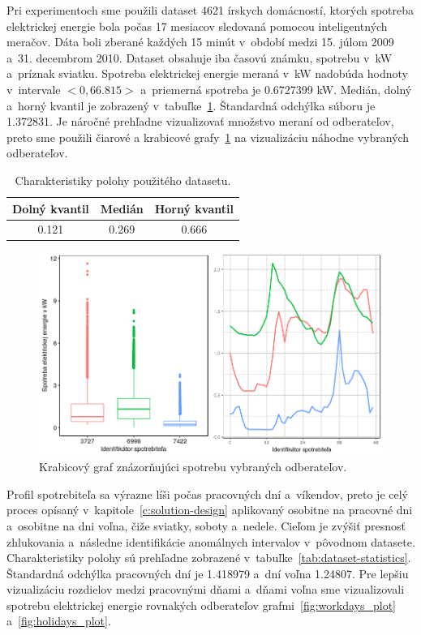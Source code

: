 \documentclass[a4paper,twoside,slovak,12pt,appendix]{article}
\begin{document}
Pri experimentoch sme použili dataset 4621 írskych domácností, ktorých spotreba
elektrickej energie bola počas 17 mesiacov sledovaná pomocou inteligentných
meračov. Dáta boli zberané každých 15 minút v~období medzi 15. júlom 2009 a~31.
decembrom 2010. Dataset obsahuje iba časovú známku, spotrebu v~kW a~príznak
sviatku. Spotreba elektrickej energie meraná v~kW nadobúda hodnoty v~intervale
$<0, 66.815>$ a~priemerná spotreba je 0.6727399 kW. Medián, dolný a~horný
kvantil je zobrazený v~tabuľke~\ref{tab:quantile}. Štandardná odchýlka súboru
je 1.372831. Je náročné prehľadne vizualizovať množstvo meraní od odberateľov,
preto sme použili čiarové a krabicové grafy~\ref{fig:whole_plot} na vizualizáciu
náhodne vybraných odberateľov.

\begin{table}[ht]
  \centering
  \caption{Charakteristiky polohy použitého datasetu.}
  \label{tab:quantile}
  \begin{tabular}{|c|c|c|}
    \hline
    \textbf{Dolný kvantil}  &   \textbf{Medián}		&		\textbf{Horný kvantil} \\ \hline
    0.121								    &   0.269							&		0.666					         \\ \hline
  \end{tabular}
\end{table}

\begin{figure}[htbp]
  \centering
  \includegraphics[width=\textwidth]{sample_plot.png}
  \caption{Krabicový graf znázorňujúci spotrebu vybraných odberateľov.}
  \label{fig:whole_plot}
\end{figure}

Profil spotrebiteľa sa výrazne líši počas pracovných dní a~víkendov, preto je
celý proces opísaný v~kapitole~\ref{c:solution-design} aplikovaný osobitne na
pracovné dni a~osobitne na dni voľna, čiže sviatky, soboty a~nedele. Cieľom je
zvýšiť presnosť zhlukovania a~následne identifikácie anomálnych intervalov
v~pôvodnom datasete. Charakteristiky polohy sú prehľadne zobrazené
v~tabuľke~\ref{tab:dataset-statistics}. Štandardná odchýlka pracovných dní je
1.418979 a~dní voľna 1.24807. Pre lepšiu vizualizáciu rozdielov medzi pracovnými
dňami a~dňami voľna sme vizualizovali spotrebu elektrickej energie rovnakých
odberateľov grafmi~\ref{fig:workdays_plot} a~\ref{fig:holidays_plot}.
\end{document}
